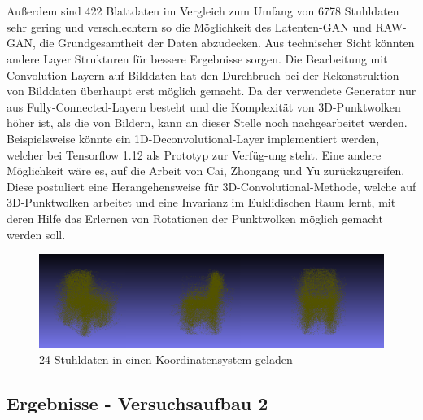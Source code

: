\documentclass{llncs}
\begin{document}
\\\\ 
Außerdem sind 422 Blattdaten im Vergleich zum Umfang von 6778 Stuhldaten sehr gering und verschlechtern so die Möglichkeit des Latenten-GAN und RAW-GAN, die Grundgesamtheit der Daten abzudecken. Aus technischer Sicht könnten andere Layer Strukturen für bessere Ergebnisse sorgen. Die Bearbeitung mit Convolution-Layern auf Bilddaten hat den  Durchbruch bei der Rekonstruktion von Bilddaten überhaupt erst möglich gemacht\cite{imagerecon}. Da der verwendete Generator nur aus Fully-Connected-Layern besteht und die Komplexität von 3D-Punktwolken höher ist,  als die von Bildern, kann an dieser Stelle noch nachgearbeitet werden. Beispielsweise könnte ein 1D-Deconvolutional-Layer implementiert werden, welcher bei Tensorflow 1.12 als Prototyp zur Verfüg-ung steht. Eine andere Möglichkeit wäre es, auf die Arbeit von Cai, Zhongang  und Yu \cite{3d-conv} zurückzugreifen. Diese postuliert eine Herangehensweise für 3D-Convolutional-Methode, welche auf 3D-Punktwolken arbeitet und eine Invarianz im Euklidischen Raum lernt, mit deren Hilfe das Erlernen von Rotationen der Punktwolken möglich gemacht werden soll.
\begin{figure}[htbp] 
	\centering
	\includegraphics[width=1.0\textwidth]{chair_all.png}
	\caption{24 Stuhldaten in einen Koordinatensystem geladen}
	\label{fig:Bild85}
\end{figure}
\newpage
\subsection{Ergebnisse - Versuchsaufbau 2}
\end{document}
